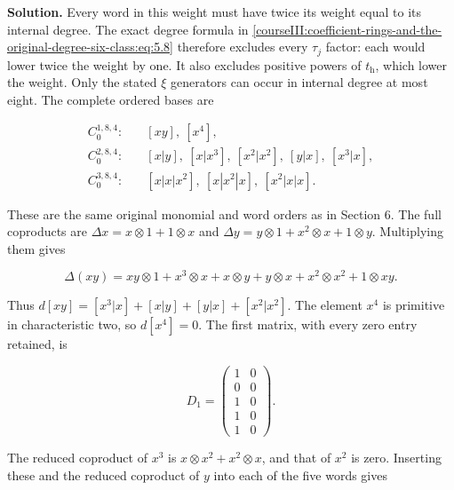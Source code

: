 \textbf{Solution.} Every word in this weight must have twice its weight equal to its internal degree. The exact degree formula in \eqref{courseIII:coefficient-rings-and-the-original-degree-six-class:eq:5.8} therefore excludes every \(\tau_j\) factor: each would lower twice the weight by one. It also excludes positive powers of \(t_{\mathrm h}\), which lower the weight. Only the stated \(\xi\) generators can occur in internal degree at most eight. The complete ordered bases are

\begin{equation}
\begin{aligned}
 C_0^{1,8,4}:&\quad [xy],\ [x^4],\\
 C_0^{2,8,4}:&\quad
 [x|y],\ [x|x^3],\ [x^2|x^2],\ [y|x],\ [x^3|x],\\
 C_0^{3,8,4}:&\quad
 [x|x|x^2],\ [x|x^2|x],\ [x^2|x|x].
 \end{aligned}
 \label{courseIII:coefficient-rings-and-the-original-degree-six-class:eq:7.5}
\end{equation}

These are the same original monomial and word orders as in Section 6. The full coproducts are
\(\Delta x=x\otimes1+1\otimes x\) and
\(\Delta y=y\otimes1+x^2\otimes x+1\otimes y\). Multiplying them gives

\begin{equation}
\Delta(xy)
 =xy\otimes1+x^3\otimes x+x\otimes y
           +y\otimes x+x^2\otimes x^2+1\otimes xy.
 \label{courseIII:coefficient-rings-and-the-original-degree-six-class:eq:7.6}
\end{equation}

Thus \(d[xy]=[x^3|x]+[x|y]+[y|x]+[x^2|x^2]\). The element \(x^4\) is primitive in characteristic two, so \(d[x^4]=0\). The first matrix, with every zero entry retained, is

\begin{equation}
D_1=
 \begin{pmatrix}
 1&0\\0&0\\1&0\\1&0\\1&0
 \end{pmatrix}.
 \label{courseIII:coefficient-rings-and-the-original-degree-six-class:eq:7.7}
\end{equation}

The reduced coproduct of \(x^3\) is \(x\otimes x^2+x^2\otimes x\), and that of \(x^2\) is zero. Inserting these and the reduced coproduct of \(y\) into each of the five words gives

